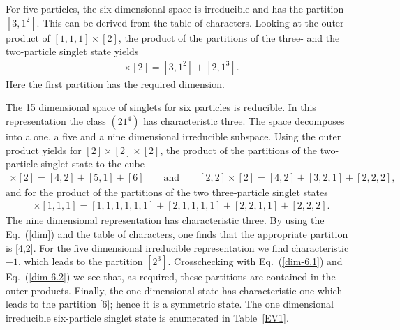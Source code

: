 \documentclass[pra,amsfonts,showpacs,preprint,showkeys]{revtex4}
\begin{document}
For five particles, the six dimensional space is
irreducible and has the partition $[3,1^2]$. This can be derived from
the table of characters.
Looking at the outer product of $[1,1,1]\times[2]$, the product of the partitions of the
three- and the two-particle singlet state yields
\begin{align}
[1,1,1]\times[2]=[3,1^2]+[2,1^3].
\end{align}
Here the first partition has the required dimension.

The 15
dimensional space of singlets for six particles is reducible. In
this representation the class $(21^4)$ has characteristic three.
The space decomposes into a one, a five and a nine dimensional
irreducible subspace.
Using the outer product yields for
$[2]\times[2]\times[2]$,  the product of the partitions of the two-particle singlet state to the cube
\begin{align}
[4]\times[2]=[4,2]+[5,1]+[6]\qquad\mbox{and}\qquad
[2,2]\times[2]=[4,2]+[3,2,1]+[2,2,2],\label{dim-6.1}
\end{align}
and for the product of the partitions of the two three-particle singlet states
\begin{align}
[1,1,1]\times[1,1,1]=[1,1,1,1,1,1]+[2,1,1,1,1]+[2,2,1,1]+[2,2,2]\label{dim-6.2}.
\end{align}
The nine dimensional representation has characteristic three.
By using the Eq.~(\ref{dim}) and the table of characters,
one finds
that the appropriate partition is [4,2].
For the five dimensional
irreducible representation we find characteristic $-1$, which leads
to the partition $[2^3]$. Crosschecking with Eq.~(\ref{dim-6.1}) and
Eq.~(\ref{dim-6.2}) we see that, as required, these partitions are
contained in the outer products. Finally, the one dimensional
state has characteristic one which leads to the partition [6];
hence it is a
symmetric state.
The one dimensional irreducible six-particle singlet
state is enumerated in Table~\ref{EV1}.  \clearpage
\end{document}

